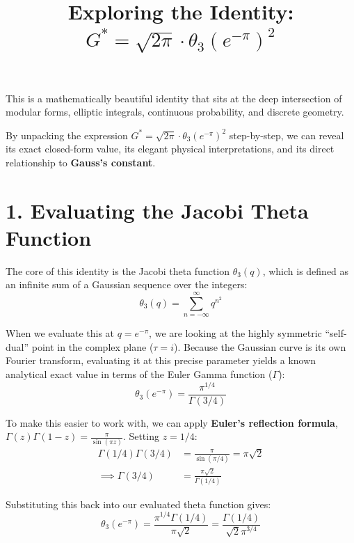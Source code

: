 \documentclass[12pt]{article}
\begin{document}
\title{\textbf{Exploring the Identity: \\ $G^* = \sqrt{2\pi} \cdot \theta_3(e^{-\pi})^2$}}
\author{}
\date{}
\maketitle

This is a mathematically beautiful identity that sits at the deep intersection of modular forms, elliptic integrals, continuous probability, and discrete geometry.

By unpacking the expression $G^* = \sqrt{2\pi} \cdot \theta_3(e^{-\pi})^2$ step-by-step, we can reveal its exact closed-form value, its elegant physical interpretations, and its direct relationship to \textbf{Gauss's constant}.

\section*{1. Evaluating the Jacobi Theta Function}
The core of this identity is the Jacobi theta function $\theta_3(q)$, which is defined as an infinite sum of a Gaussian sequence over the integers:
\begin{equation}
    \theta_3(q) = \sum_{n=-\infty}^\infty q^{n^2}
\end{equation}

When we evaluate this at $q = e^{-\pi}$, we are looking at the highly symmetric ``self-dual'' point in the complex plane ($\tau = i$). Because the Gaussian curve is its own Fourier transform, evaluating it at this precise parameter yields a known analytical exact value in terms of the Euler Gamma function ($\Gamma$):
\begin{equation}
    \theta_3(e^{-\pi}) = \frac{\pi^{1/4}}{\Gamma(3/4)}
\end{equation}

To make this easier to work with, we can apply \textbf{Euler's reflection formula}, $\Gamma(z)\Gamma(1-z) = \frac{\pi}{\sin(\pi z)}$. Setting $z = 1/4$:
\begin{align}
    \Gamma(1/4)\Gamma(3/4) &= \frac{\pi}{\sin(\pi/4)} = \pi\sqrt{2} \\
    \implies \Gamma(3/4) &= \frac{\pi\sqrt{2}}{\Gamma(1/4)}
\end{align}

Substituting this back into our evaluated theta function gives:
\begin{equation}
    \theta_3(e^{-\pi}) = \frac{\pi^{1/4} \Gamma(1/4)}{\pi\sqrt{2}} = \frac{\Gamma(1/4)}{\sqrt{2}\pi^{3/4}}
\end{equation}
\end{document}
